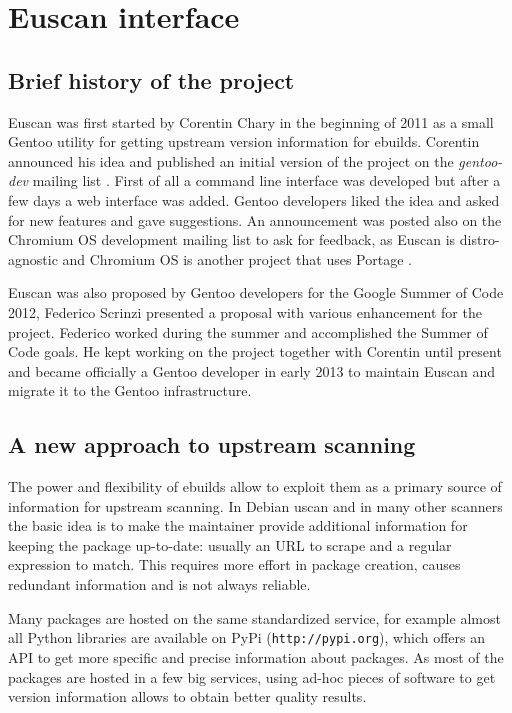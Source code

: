 \chapter{Euscan interface}

\section{Brief history of the project}

Euscan was first started by Corentin Chary in the beginning of 2011 as a small Gentoo utility for getting upstream version information for ebuilds. Corentin announced his idea and published an initial version of the project on the \emph{gentoo-dev} mailing list \cite{euscan_announcement}.
First of all a command line interface was developed but after a few days a web interface was added. Gentoo developers liked the idea and asked for new features and gave suggestions. An announcement was posted also on the Chromium OS development mailing list to ask for feedback, as Euscan is distro-agnostic and Chromium OS is another project that uses Portage \cite{euscan_chromium}.

Euscan was also proposed by Gentoo developers for the Google Summer of Code 2012, Federico Scrinzi presented a proposal with various enhancement for the project. Federico worked during the summer and accomplished the Summer of Code goals. He kept working on the project together with Corentin until present and became officially a Gentoo developer in early 2013 to maintain Euscan and migrate it to the Gentoo infrastructure.


\section{A new approach to upstream scanning}
The power and flexibility of ebuilds allow to exploit them as a primary source of information for upstream scanning. In Debian uscan and in many other scanners the basic idea is to make the maintainer provide additional information for keeping the package up-to-date: usually an URL to scrape and a regular expression to match. This requires more effort in package creation, causes redundant information and is not always reliable.

Many packages are hosted on the same standardized service, for example almost all Python libraries are available on PyPi (\texttt{http://pypi.org}), which offers an API to get more specific and precise information about packages. As most of the packages are hosted in a few big services, using ad-hoc pieces of software to get version information allows to obtain better quality results.

